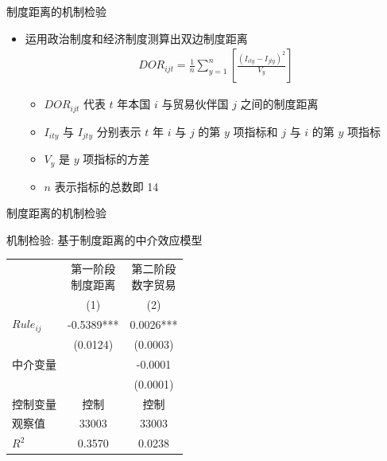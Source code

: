 \documentclass{beamer}
\begin{document}
\begin{frame}{制度距离的机制检验}
    \begin{itemize}
        \item 运用政治制度和经济制度测算出双边制度距离
            \begin{gather*}
                DOR_{ijt}=\frac{1}{n} \sum_{y=1}^{n} [\frac{(I_{ity}-I_{jty})^2}{V_y}] \tag{17}
            \end{gather*}
            \begin{itemize}
                \item $DOR_{ijt}$ 代表 $t$ 年本国 $i$ 与贸易伙伴国 $j$ 之间的制度距离
                \item $I_{ity}$ 与 $I_{jty}$ 分别表示 $t$ 年 $i$ 与 $j$ 的第 $y$ 项指标和 $j$ 与 $i$ 的第 $y$ 项指标
                \item $V_y$ 是 $y$ 项指标的方差
                \item $n$ 表示指标的总数即 14
            \end{itemize}
    \end{itemize}
\end{frame}

\begin{frame}{制度距离的机制检验}
    \centering
    \begin{threeparttable}
        \caption{机制检验: 基于制度距离的中介效应模型}
        \begin{tabular}{lcc}
            \toprule
            & \makecell[c]{第一阶段 \\ 制度距离} & \makecell[c]{第二阶段 \\ 数字贸易} \\
            & (1) & (2) \\
            \midrule
            $Rule_{ij}$ & -0.5389*** & 0.0026*** \\
            & (0.0124) & (0.0003) \\
            中介变量 & & -0.0001 \\
            & & (0.0001) \\
            控制变量 & 控制 & 控制 \\
            观察值 & 33003 & 33003 \\
            $R^2$ & 0.3570 & 0.0238 \\
            \bottomrule
        \end{tabular}
    \end{threeparttable}
\end{frame}
\end{document}
